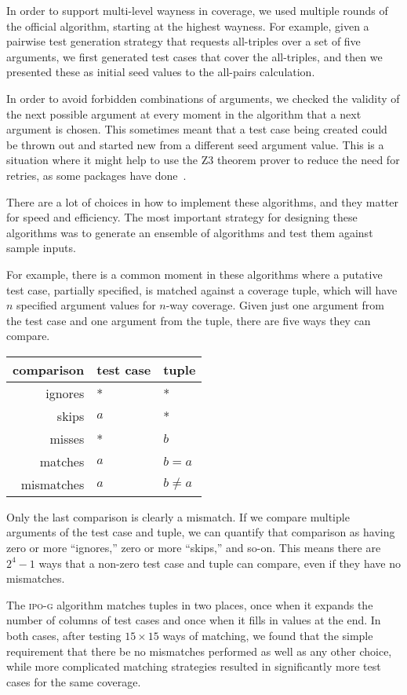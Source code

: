 \documentclass{juliacon}
\begin{document}
\vskip 6pt
In order to support multi-level wayness in coverage, we used multiple rounds of the official algorithm, starting at the highest wayness. For example, given a pairwise test generation strategy that requests all-triples over a set of five arguments, we first generated test cases that cover the all-triples, and then we presented these as initial seed values to the all-pairs calculation.

\vskip 6pt
In order to avoid forbidden combinations of arguments, we checked the validity of the next possible argument at every moment in the algorithm that a next argument is chosen. This sometimes meant that a test case being created could be thrown out and started new from a different seed argument value. This is a situation where it might help to use the Z3 theorem prover to reduce the need for retries, as some packages have done~\cite{Nie2011-yl}.

\vskip 6pt
There are a lot of choices in how to implement these algorithms, and they matter for speed and efficiency. The most important strategy for designing these algorithms was to generate an ensemble of algorithms and test them against sample inputs.

\vskip 6pt
For example, there is a common moment in these algorithms where a putative test case, partially specified, is matched against a coverage tuple, which will have $n$ specified argument values for $n$-way coverage. Given just one argument from the test case and one argument from the tuple, there are five ways they can compare.
\begin{center}
\begin{tabular}{rll}
comparison & test case & tuple \\ \hline
ignores & * & * \\
skips & $a$ & * \\
misses & * & $b$ \\
matches & $a$ & $b=a$ \\
mismatches & $a$ & $b\ne a$
\end{tabular}
\end{center}
Only the last comparison is clearly a mismatch. If we compare multiple arguments of the test case and tuple, we can quantify that comparison as having zero or more ``ignores,'' zero or more ``skips,'' and so-on. This means there are $2^4-1$ ways that a non-zero test case and tuple can compare, even if they have no mismatches.

\vskip 6pt
The \textsc{ipo-g} algorithm matches tuples in two places, once when it expands the number of columns of test cases and once when it fills in values at the end. In both cases, after testing $15\times 15$ ways of matching, we found that the simple requirement that there be no mismatches performed as well as any other choice, while more complicated matching strategies resulted in significantly more test cases for the same coverage.
\end{document}
